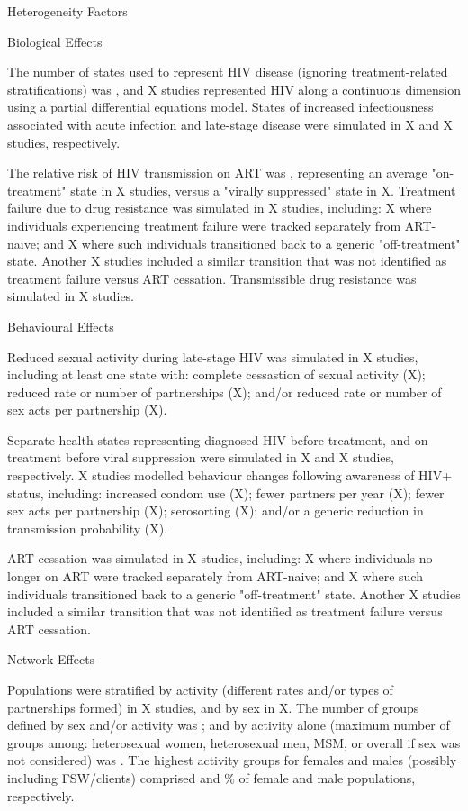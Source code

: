 Heterogeneity Factors

Biological Effects

The \xdmdef number of states used to represent HIV disease
(ignoring treatment-related stratifications) was ,
and X studies represented HIV along a continuous dimension
using a partial differential equations model.
States of increased infectiousness associated with acute infection and late-stage disease
were simulated in X and X studies, respectively.

The relative risk of HIV transmission on ART was ,
representing an average "on-treatment" state in X studies,
versus a "virally suppressed" state in X.
Treatment failure due to drug resistance was simulated in X studies, including:
X where individuals experiencing treatment failure
were tracked separately from ART-naive; and
X where such individuals
transitioned back to a generic "off-treatment" state.
Another X studies included a similar transition
that was not identified as treatment failure versus ART cessation.
Transmissible drug resistance was simulated in X studies.

Behavioural Effects

Reduced sexual activity during late-stage HIV was simulated in X studies,
including at least one state with:
complete cessastion of sexual activity (X);
reduced rate or number of partnerships (X); and/or
reduced rate or number of sex acts per partnership (X).

Separate health states representing diagnosed HIV before treatment,
and on treatment before viral suppression were simulated in
X and X studies, respectively.
X studies modelled behaviour changes following awareness of HIV+ status, including:
increased condom use (X);
fewer partners per year (X);
fewer sex acts per partnership (X);
serosorting (X); and/or
a generic reduction in transmission probability (X).

ART cessation was simulated in X studies, including:
X where individuals no longer on ART
were tracked separately from ART-naive; and
X where such individuals
transitioned back to a generic "off-treatment" state.
Another X studies included a similar transition
that was not identified as treatment failure versus ART cessation.

Network Effects

Populations were stratified by activity (different rates and/or types of partnerships formed)
in X studies, and by sex in X.
The number of groups defined by sex and/or activity was ;
and by activity alone (maximum number of groups among:
heterosexual women, heterosexual men, MSM, or overall if sex was not considered) was .
The highest activity groups for females and males (possibly including FSW/clients) comprised
 and  \% of female and male populations, respectively.

